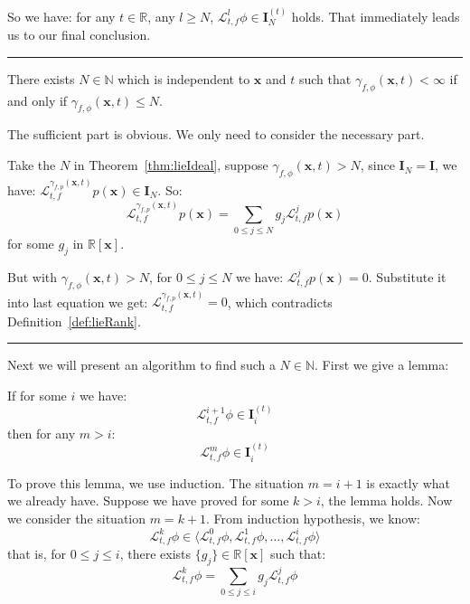 \documentclass{jssc}
\newcommand{\rulex}{\hfill\rule{1mm}{3mm}}
\begin{document}
So we have: for any $t \in \mathbb{R}$, any $l \geq N$, $\mathcal{L}_{t, f}^l \phi  \in \boldsymbol{I}_N^{(t)}$ holds. That immediately leads us to our final conclusion.
\rulex \newline

\begin{corollary}
\label{cor:lieRank}
There exists $N \in \mathbb{N}$ which is independent to $\boldsymbol{x}$ and $t$ such that $\gamma_{f, \phi}(\boldsymbol{x}, t) < \infty$ if and only if $\gamma_{f, \phi}(\boldsymbol{x}, t) \leq N$.
\end{corollary}
\proof
The sufficient part is obvious. We only need to consider the necessary part.

Take the $N$ in Theorem~\ref{thm:lieIdeal}, suppose $\gamma_{f, \phi}(\boldsymbol{x}, t) > N$, since $\boldsymbol{I}_N = \boldsymbol{I}$, we have:  $\mathcal{L}_{t, f}^{\gamma_{f, p}(\boldsymbol{x}, t)} p(\boldsymbol{x}) \in \boldsymbol{I}_N$. So:
\begin{equation*}
	 \mathcal{L}_{t, f}^{\gamma_{f, p}(\boldsymbol{x}, t)} p(\boldsymbol{x}) = \sum_{0 \leq j \leq N} g_j \mathcal{L}_{t, f}^j p(\boldsymbol{x})
\end{equation*}
for some $g_j$ in $\mathbb{R}[\boldsymbol{x}]$.

But with $\gamma_{f, \phi}(\boldsymbol{x}, t) > N$, for $0 \leq j \leq N$ we have: $\mathcal{L}_{t, f}^j p(\boldsymbol{x}) = 0$. Substitute it into last equation we get:  $\mathcal{L}_{t, f}^{\gamma_{f, p}(\boldsymbol{x}, t)} = 0$, which contradicts Definition~\ref{def:lieRank}.
\rulex \newline

Next we will present an algorithm to find such a $N \in \mathbb{N}$. First we give a lemma:
\begin{lemma}
\label{lem:fixed}
If for some $i$ we have:
	\begin{equation*}
		\mathcal{L}_{t, f}^{i+1} \phi \in \boldsymbol{I}_i^{(t)}
	\end{equation*}
	then for any $m>i$:
	\begin{equation*}
		\mathcal{L}_{t, f}^{m} \phi \in \boldsymbol{I}_i^{(t)}
	\end{equation*}
\end{lemma}

\proof
To prove this lemma, we use induction. The situation $m = i+1$ is exactly what we already have. Suppose we have proved for some $k > i$, the lemma holds. Now we consider the situation $m = k+1$. From induction hypothesis, we know:
		\begin{equation*}
			\mathcal{L}_{t, f}^k \phi \in \langle \mathcal{L}_{t, f}^0 \phi, \mathcal{L}_{t, f}^1 \phi, \dots, \mathcal{L}_{t, f}^i \phi \rangle
		\end{equation*}
that is, for $0 \leq j \leq i$, there exists $\{ g_j \} \in \mathbb{R} [\boldsymbol{x}]$ such that:
		\begin{equation*}
			\mathcal{L}_{t, f}^k \phi = \sum_{0 \leq j \leq i} g_j \mathcal{L}_{t, f}^j \phi
		\end{equation*}
\end{document}
